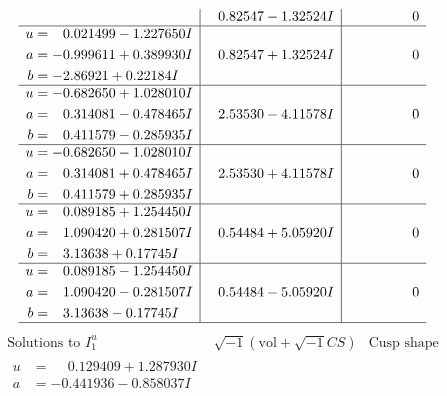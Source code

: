 \documentclass[1p]{elsarticle_modified}
\theoremstyle{definition}
\newcommand{\I}{\sqrt{-1}}
\begin{document}
$$\begin{array}{c|c|c}
 & \phantom{-}0.82547 - 1.32524 I & \phantom{-0.000000 } 0 \\ \hline\begin{aligned}
u &= \phantom{-}0.021499 - 1.227650 I \\
a &= -0.999611 + 0.389930 I \\
b &= -2.86921 + 0.22184 I\end{aligned}
 & \phantom{-}0.82547 + 1.32524 I & \phantom{-0.000000 } 0 \\ \hline\begin{aligned}
u &= -0.682650 + 1.028010 I \\
a &= \phantom{-}0.314081 - 0.478465 I \\
b &= \phantom{-}0.411579 - 0.285935 I\end{aligned}
 & \phantom{-}2.53530 - 4.11578 I & \phantom{-0.000000 } 0 \\ \hline\begin{aligned}
u &= -0.682650 - 1.028010 I \\
a &= \phantom{-}0.314081 + 0.478465 I \\
b &= \phantom{-}0.411579 + 0.285935 I\end{aligned}
 & \phantom{-}2.53530 + 4.11578 I & \phantom{-0.000000 } 0 \\ \hline\begin{aligned}
u &= \phantom{-}0.089185 + 1.254450 I \\
a &= \phantom{-}1.090420 + 0.281507 I \\
b &= \phantom{-}3.13638 + 0.17745 I\end{aligned}
 & \phantom{-}0.54484 + 5.05920 I & \phantom{-0.000000 } 0 \\ \hline\begin{aligned}
u &= \phantom{-}0.089185 - 1.254450 I \\
a &= \phantom{-}1.090420 - 0.281507 I \\
b &= \phantom{-}3.13638 - 0.17745 I\end{aligned}
 & \phantom{-}0.54484 - 5.05920 I & \phantom{-0.000000 } 0\\
 \hline 
 \end{array}$$\newpage$$\begin{array}{c|c|c}  
\text{Solutions to }I^u_{1}& \I (\text{vol} + \sqrt{-1}CS) & \text{Cusp shape}\\
 \hline 
\begin{aligned}
u &= \phantom{-}0.129409 + 1.287930 I \\
a &= -0.441936 - 0.858037 I \\

\end{aligned}
\end{array}$$
\end{document}
